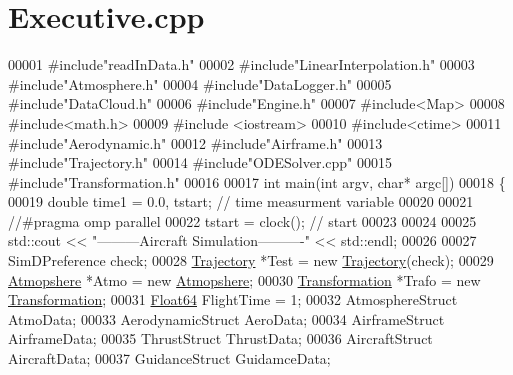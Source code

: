 \hypertarget{_executive_8cpp_source}{}\section{Executive.\+cpp}
\label{_executive_8cpp_source}

\begin{DoxyCode}
00001 \textcolor{preprocessor}{#include"readInData.h"}
00002 \textcolor{preprocessor}{#include"LinearInterpolation.h"}
00003 \textcolor{preprocessor}{#include"Atmosphere.h"}
00004 \textcolor{preprocessor}{#include"DataLogger.h"}
00005 \textcolor{preprocessor}{#include"DataCloud.h"}
00006 \textcolor{preprocessor}{#include"Engine.h"}
00007 \textcolor{preprocessor}{#include<Map>}
00008 \textcolor{preprocessor}{#include<math.h>}
00009 \textcolor{preprocessor}{#include <iostream>}
00010 \textcolor{preprocessor}{#include<ctime>}
00011 \textcolor{preprocessor}{#include"Aerodynamic.h"}
00012 \textcolor{preprocessor}{#include"Airframe.h"}
00013 \textcolor{preprocessor}{#include"Trajectory.h"}
00014 \textcolor{preprocessor}{#include"ODESolver.cpp"}
00015 \textcolor{preprocessor}{#include"Transformation.h"}
00016 
00017 \textcolor{keywordtype}{int} main(\textcolor{keywordtype}{int} argv, \textcolor{keywordtype}{char}* argc[])
00018 \{
00019     \textcolor{keywordtype}{double} time1 = 0.0, tstart;      \textcolor{comment}{// time measurment variable}
00020 
00021 \textcolor{comment}{//#pragma omp parallel }
00022         tstart = clock();              \textcolor{comment}{// start }
00023 
00024 
00025         std::cout << \textcolor{stringliteral}{"---------Aircraft Simulation----------"} << std::endl;
00026 
00027         SimDPreference check;
00028         \hyperlink{group___trajectory_class_trajectory}{Trajectory} *Test = \textcolor{keyword}{new} \hyperlink{group___trajectory_class_trajectory}{Trajectory}(check);
00029         \hyperlink{group___atmosphere_class_atmopshere}{Atmopshere} *Atmo = \textcolor{keyword}{new} \hyperlink{group___atmosphere_class_atmopshere}{Atmopshere};
00030         \hyperlink{class_transformation}{Transformation} *Trafo = \textcolor{keyword}{new} \hyperlink{class_transformation}{Transformation};
00031         \hyperlink{group___tools_ga3f1431cb9f76da10f59246d1d743dc2c}{Float64}              FlightTime = 1;
00032         AtmosphereStruct    AtmoData;
00033         AerodynamicStruct   AeroData;
00034         AirframeStruct      AirframeData;
00035         ThrustStruct        ThrustData;
00036         AircraftStruct      AircraftData;
00037         GuidanceStruct      GuidamceData;

\end{DoxyCode}
